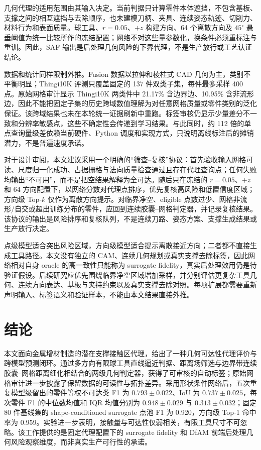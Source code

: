 几何代理的适用范围由其输入决定。当前判据只计算零件本体遮挡，不包含基板、支撑之间的相互遮挡与去除顺序，也未建模刀柄、夹具、连续姿态轨迹、切削力、材料行为和表面质量。球工具、$r=0.05$、$+z$ 构建方向、64 个离散方向及 $45^\circ$ 悬垂阈值为统一比较所作的冻结配置；网络不对这些量参数化，换条件必须重标注与重训。因此，SAF 输出是后处理几何风险的下界代理，不是生产放行或工艺认证结论。

数据和统计同样限制外推。Fusion 数据以拉伸和棱柱式 CAD 几何为主，类别不平衡明显；Thingi10K 评测只覆盖固定的 137 件双类子集，每件最多采样 400 点。原始网格审计显示 Thingi10K 两类件中 21.17\% 含边界边、10.95\% 含非流形边，因此不能把固定子集的历史跨域数值理解为对任意网格质量或零件类别的泛化保证。该跨域结果也未在本轮统一证据刷新中重跑。标签审核仍显示少量差分不一致和分辨率敏感点，这些不确定性会传递到学习结果。与此同时，约 112 倍的单点查询量级差依赖当前硬件、Python 调度和实现方式，只说明离线标注后的摊销潜力，不是普遍速度承诺。

对于设计审阅，本文建议采用一个明确的“筛查--复核”协议：首先验收输入网格可读、尺度归一化成功、占据栅格与法向质量检查通过且存在代理查询点；任何失败均输出“不可用”，而不是把空结果解释为全可达。随后只在冻结的 $r=0.05$、$+z$ 和 64 方向配置下，以网络分数对代理点排序，优先复核高风险和低置信度区域；方向级 Top-$k$ 仅作为离散方向提示。对临界净空、eligible 点数过少、网格非流形/自交或超出训练分布的零件，应回到连续胶囊--网格判定器，并记录复核结果。该协议的输出是风险排序和复核队列，不是连续刀路、姿态方案、支撑生成结果或生产放行决定。

点级模型适合突出风险区域，方向级模型适合提示离散接近方向；二者都不直接生成工具路径。本文没有独立的 CAM、连续几何规划或真实支撑去除标签，因此网络相对自身 oracle 的高一致性只能称为 surrogate fidelity，真实后处理效用仍是待验证假设。后续研究应优先围绕临界净空区域增加采样，并分别评估更复杂工具几何、连续方向表达、基板与夹持约束以及真实支撑去除对照。每项扩展都需要重新声明输入、标签语义和验证样本，不能由本文结果直接外推。

\section{结论}

本文面向金属增材制造的潜在支撑接触区代理，给出了一种几何可达性代理评价与跨模型预测闭环。通过多方向有限球工具直线逼近判据、距离场筛选与边界带连续胶囊--网格距离细化相结合的两级几何判定器，获得了可审核的自动标签；原始网格审计进一步披露了保留数据的可读性与拓扑差异。采用形状条件网络后，五次重复模型级留出的零件等权不可达类 F1 为 $0.793\pm0.022$、IoU 为 $0.737\pm0.025$，每次零件 F1 的中位数均值和 IQR 均值分别为 $0.948\pm0.029$ 与 $0.313\pm0.032$；固定 80 件基线集的 shape-conditioned surrogate 点池 F1 为 0.920，方向级 Top-1 命中率为 0.959。实验进一步表明，接触量与可达性仅弱相关，有限工具尺寸不可忽略。该工作提供的是固定代理配置下的 surrogate fidelity 和 DfAM 前端后处理几何风险观察维度，而非真实生产可行性的承诺。

